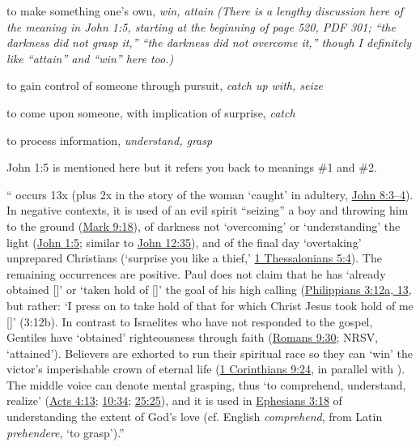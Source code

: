 				\begin{compactdesc}
					\item[BDAG 460b] \textbf{}
						\begin{compactitem}
							\item[1] to make something one's own, \textit{win, attain} \textit{(There is a lengthy discussion here of the meaning in John 1:5, starting at the beginning of page 520, PDF 301; ``the darkness did not grasp it,'' ``the darkness did not overcome it,'' though I definitely like ``attain'' and ``win'' here too.)}
							\item[2] to gain control of someone through pursuit, \textit{catch up with, seize}
							\item[3] to come upon someone, with implication of surprise, \textit{catch}
							\item[4] to process information, \textit{understand, grasp}
								\begin{compactitem}
									\item John 1:5 is mentioned here but it refers you back to meanings \#1 and \#2.
								\end{compactitem}
						\end{compactitem}
					\item[NIDNTTE 3:83] `` occurs 13x (plus 2x in the story of the woman `caught' in adultery, \hyperref[JOHN-8-3]{John 8:3--4}). In negative contexts, it is used of an evil spirit ``seizing'' a boy and throwing him to the ground (\hyperref[MARK-9-18]{Mark 9:18}), of darkness not `overcoming' or `understanding' the light (\hyperref[JOHN-1-5]{John 1:5}; similar to \hyperref[JOHN-12-35]{John 12:35}), and of the final day `overtaking' unprepared Christians (`surprise you like a thief,' \hyperref[1THESSALONIANS-5-4]{1 Thessalonians 5:4}). The remaining occurrences are positive. Paul does not claim that he has `already obtained []' or `taken hold of []' the goal of his high calling (\hyperref[PHILIPPIANS-3-12]{Philippians 3:12a, 13}, but rather: `I press on to take hold of that for which Christ Jesus took hold of me []' (3:12b). In contrast to Israelites who have not responded to the gospel, Gentiles have `obtained' righteousness through faith (\hyperref[ROMANS-9-30]{Romans 9:30}; NRSV, `attained'). Believers are exhorted to run their spiritual race so they can `win' the victor's imperishable crown of eternal life (\hyperref[1CORINTHIANS-9-24]{1 Corinthians 9:24}, in parallel with ). The middle voice can denote mental grasping, thus `to comprehend, understand, realize' (\hyperref[ACTS-4-13]{Acts 4:13}; \hyperref[ACTS-10-34]{10:34}; \hyperref[ACTS-25-25]{25:25}), and it is used in \hyperref[EPHESIANS-3-18]{Ephesians 3:18} of understanding the extent of God's love (cf. English \textit{comprehend}, from Latin \textit{prehendere}, `to grasp').''

\end{compactdesc}

